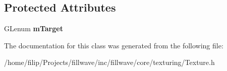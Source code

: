 \subsection*{Protected Attributes}
\begin{DoxyCompactItemize}
\item 
G\+Lenum {\bfseries m\+Target}\hypertarget{classflw_1_1flc_1_1Texture_a62572043b6ab94c55e022cc122825de1}{}\label{classflw_1_1flc_1_1Texture_a62572043b6ab94c55e022cc122825de1}

\end{DoxyCompactItemize}


The documentation for this class was generated from the following file\+:\begin{DoxyCompactItemize}
\item 
/home/filip/\+Projects/fillwave/inc/fillwave/core/texturing/Texture.\+h\end{DoxyCompactItemize}

